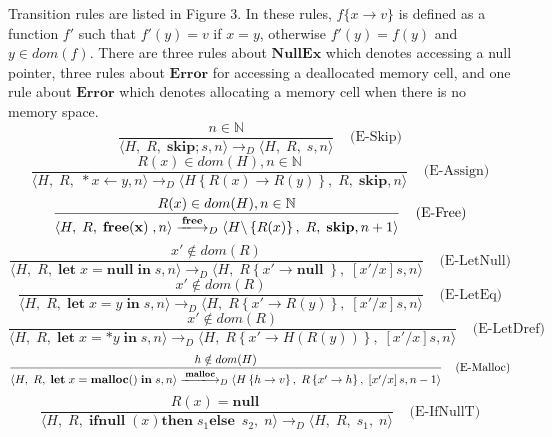 \documentclass[english]{jssst_ppl} %
\newcommand\LET{\mathbf{let}\;}
\newcommand\FREE{\mathbf{free(x)}\;}
\newcommand\IN{\mathbf{in}\;}
\newcommand\SKIP{\mathbf{skip}}
\newcommand\Rtab{\; \; \; \;}
\newcommand\NULL{\mathbf{null}\;}
\newcommand\IFNULL{\mathbf{ifnull}\;}
\newcommand\THEN{\mathbf{then}\;}
\newcommand\ELSE{\mathbf{else}\;}
\newcommand\Lfc{\left\{}
\newcommand\Rfc{\right\}}
\newcommand\Lb{\left[}
\newcommand\Rb{\right]}
\newcommand\coma{,\;}
\newcommand\Malloc{\mathbf{malloc}}
\newcommand\Free{\mathbf{free}}
\newcommand\Cirx{(x)}
\begin{document}
Transition rules are listed in Figure 3. In these rules, $f\{x\to v\}$ is defined as a function $f'$ such that $f'(y) = v$ if $x = y$, otherwise $f'(y) = f(y)$ and $y \in dom(f)$. There are three rules about $\mathbf{NullEx}$ which denotes accessing a null pointer, three rules about $\mathbf{Error}$ for accessing a deallocated memory cell, and one rule about $\mathbf{Error}$ which denotes allocating a memory cell when there is no memory space.
$$
    \frac{n \in \mathbb{N}}
            {\langle H\coma R\coma  \SKIP;s , n \rangle
              \longrightarrow_{D}
                \langle H\coma R\coma   s , n \rangle }
     \Rtab \mbox{(E-Skip)}
$$
$$
     \frac{R(x) \in dom(H), n \in \mathbb{N}}
           {\langle H\coma R\coma  *x \leftarrow y , n \rangle
             \longrightarrow_{D}
             \langle H \Lfc R(x) \rightarrow R(y) \Rfc \coma R \coma   \SKIP , n  \rangle }
     \Rtab \mbox{(E-Assign)}
$$
$$
     \frac{R(x) \in dom(H) , n \in \mathbb{N}}
          {\langle H\coma R\coma  \FREE , n \rangle
            \xlongrightarrow{\Free}_{D}
            \langle H\backslash \Lfc R(x) \Rfc \coma R \coma   \SKIP , n+1  \rangle }
     \Rtab \mbox{(E-Free)}
$$
$$
     \frac{x' \notin dom(R)}
           {\langle H\coma R\coma  \LET x = \NULL \IN s , n \rangle
             \longrightarrow_{D}
             \langle H\coma R\Lfc x' \rightarrow \NULL \Rfc \coma   \Lb x'/x \Rb s , n  \rangle }
     \Rtab \mbox{(E-LetNull)}
$$
$$
     \frac{x' \notin dom(R)}
            {\langle H\coma R\coma \LET x = y \; \IN s , n \rangle
              \longrightarrow_{D}
              \langle H\coma R\Lfc x' \rightarrow R(y) \Rfc \coma   \Lb x'/x \Rb s , n  \rangle }
\Rtab \mbox{(E-LetEq)}
$$
$$
     \frac{x' \notin dom(R)}
            {\langle H\coma R\coma  \LET x = *y \; \IN s , n \rangle
              \longrightarrow_{D}
              \langle H\coma R\Lfc x' \rightarrow H(R(y)) \Rfc \coma   \Lb x'/x \Rb s , n  \rangle }
     \Rtab \mbox{(E-LetDref)}
$$
$$
     \frac{h \notin dom(H)}
            {\langle H\coma R\coma  \LET x = \Malloc() \; \IN s , n \rangle
              \xlongrightarrow{\Malloc}_{D}
              \langle H \Lfc h \rightarrow v\Rfc \coma R\Lfc x' \rightarrow h \Rfc \coma   \Lb x'/x \Rb s , n-1  \rangle }
\Rtab \mbox{(E-Malloc)}
$$
$$
    \frac{R(x) = \NULL}
           {\langle H \coma R \coma \IFNULL\Cirx   \THEN   s_{1} \ELSE\  s_{2} \coma  n \rangle
           \longrightarrow_{D}
           \langle H\coma R\coma s_{1} \coma n \rangle}
    \Rtab \mbox{(E-IfNullT)}
$$
\end{document}
